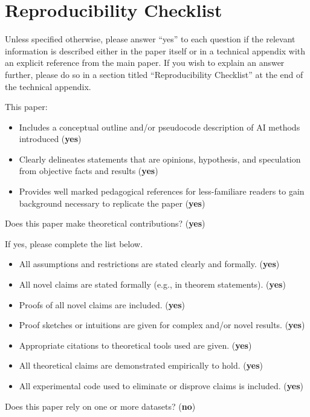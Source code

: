 \onecolumn
\newpage
\section{Reproducibility Checklist}
Unless specified otherwise, please answer “yes” to each question if the relevant information is described either in the paper itself or in a technical appendix with an explicit reference from the main paper. If you wish to explain an answer further, please do so in a section titled “Reproducibility Checklist” at the end of the technical appendix.

This paper:

\begin{itemize}
    \item Includes a conceptual outline and/or pseudocode description of AI methods introduced (\textbf{yes})
    \item Clearly delineates statements that are opinions, hypothesis, and speculation from objective facts and results (\textbf{yes})
    \item Provides well marked pedagogical references for less-familiare readers to gain background necessary to replicate the paper (\textbf{yes})
\end{itemize}

Does this paper make theoretical contributions? (\textbf{yes})

If yes, please complete the list below.
\begin{itemize}
    \item All assumptions and restrictions are stated clearly and formally. (\textbf{yes})
    \item All novel claims are stated formally (e.g., in theorem statements). (\textbf{yes})
    \item Proofs of all novel claims are included. (\textbf{yes})
    \item Proof sketches or intuitions are given for complex and/or novel results. (\textbf{yes})
    \item Appropriate citations to theoretical tools used are given. (\textbf{yes})
    \item All theoretical claims are demonstrated empirically to hold. (\textbf{yes})
    \item All experimental code used to eliminate or disprove claims is included. (\textbf{yes})
\end{itemize}

Does this paper rely on one or more datasets? (\textbf{no})

